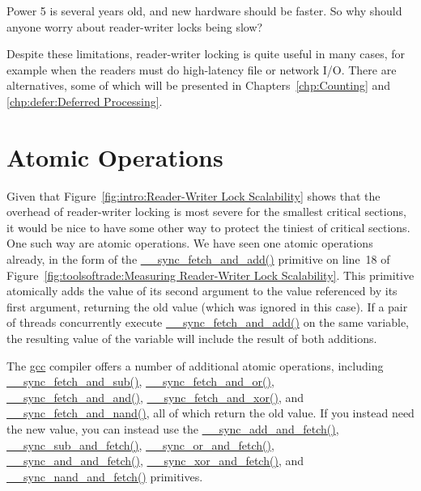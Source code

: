 \QuickQuiz{}
	Power 5 is several years old, and new hardware should
	be faster.
	So why should anyone worry about reader-writer locks being slow?
 \QuickQuizEnd

Despite these limitations, reader-writer locking is quite useful in many
cases, for example when the readers must do high-latency file or network I/O.
There are alternatives, some of which will be presented in
Chapters~\ref{chp:Counting} and \ref{chp:defer:Deferred Processing}.

\section{Atomic Operations}
\label{sec:toolsoftrade:Atomic Operations}

Given that
Figure~\ref{fig:intro:Reader-Writer Lock Scalability}
shows that the overhead of reader-writer locking is most severe for the
smallest critical sections, it would be nice to have some other way
to protect the tiniest of critical sections.
One such way are atomic operations.
We have seen one atomic operations already, in the form of the
\url{__sync_fetch_and_add()} primitive on line~18 of
Figure~\ref{fig:toolsoftrade:Measuring Reader-Writer Lock Scalability}.
This primitive atomically adds the value of its second argument to
the value referenced by its first argument, returning the old value
(which was ignored in this case).
If a pair of threads concurrently execute \url{__sync_fetch_and_add()} on
the same variable, the resulting value of the variable will include
the result of both additions.

The \url{gcc} compiler offers a number of additional atomic operations,
including \url{__sync_fetch_and_sub()},
\url{__sync_fetch_and_or()},
\url{__sync_fetch_and_and()},
\url{__sync_fetch_and_xor()}, and
\url{__sync_fetch_and_nand()}, all of which return the old value.
If you instead need the new value, you can instead use the
\url{__sync_add_and_fetch()},
\url{__sync_sub_and_fetch()},
\url{__sync_or_and_fetch()},
\url{__sync_and_and_fetch()},
\url{__sync_xor_and_fetch()}, and
\url{__sync_nand_and_fetch()} primitives.


